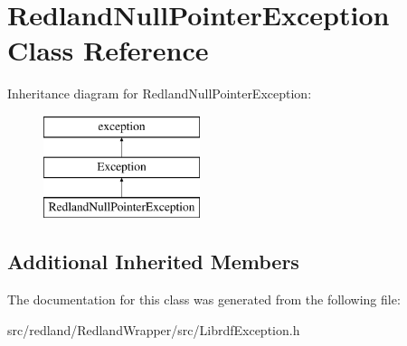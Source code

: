 \hypertarget{classRedlandNullPointerException}{}\section{Redland\+Null\+Pointer\+Exception Class Reference}
\label{classRedlandNullPointerException}
Inheritance diagram for Redland\+Null\+Pointer\+Exception\+:\begin{figure}[H]
\begin{center}
\leavevmode
\includegraphics[height=3.000000cm]{classRedlandNullPointerException}
\end{center}
\end{figure}
\subsection*{Additional Inherited Members}


The documentation for this class was generated from the following file\+:\begin{DoxyCompactItemize}
\item 
src/redland/\+Redland\+Wrapper/src/Librdf\+Exception.\+h\end{DoxyCompactItemize}
